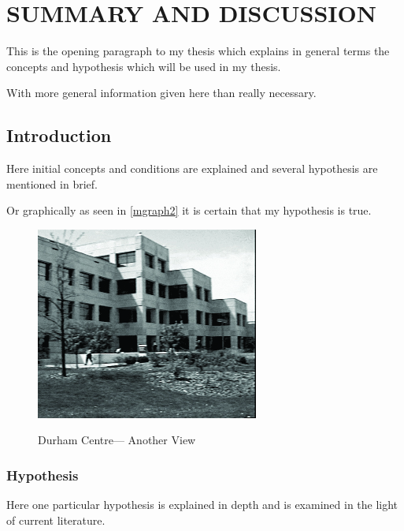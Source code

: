 \chapter{SUMMARY AND DISCUSSION}

This is the opening paragraph to my thesis which
explains in general terms the concepts and hypothesis
which will be used in my thesis.

With more general information given here than really
necessary.

\section{Introduction}

Here initial concepts and conditions are explained and
several hypothesis are mentioned in brief.

Or graphically as seen in \autoref{mgraph2}
it is certain that my hypothesis is true.


\begin{figure}[H] \centering %
    \includegraphics[alt={This is alt text}]{Images/dc5}

    \caption{Durham Centre---  Another View}
    \label{mgraph2}
\end{figure}

\subsection{Hypothesis}

Here one particular hypothesis is explained in depth
and is examined in the light of current literature.


